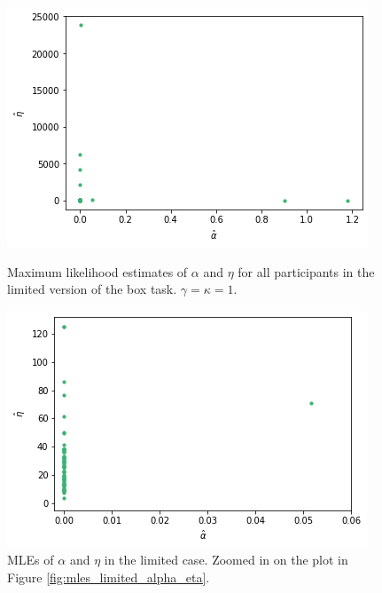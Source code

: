 \begin{figure}
    \centering
    \begin{minipage}{0.48\textwidth}
        \centering
        \includegraphics[scale=0.38]{pictures/plotted_mles_limited_alpha_eta_gk1.png}
        \caption[MLEs of $\alpha$ and $\eta$, limited. $\gamma=\kappa=1$]{Maximum likelihood estimates of $\alpha$ and $\eta$ for all participants in the limited version of the box task. $\gamma=\kappa=1$.}
        \label{fig:mles_limited_alpha_eta}
    \end{minipage}\hfill
    \begin{minipage}{0.48\textwidth}
        \centering
        \includegraphics[scale=0.38]{pictures/plotted_mles_limited_alpha_eta_gk1_zoomed.png}
        \caption[MLEs of $\alpha$ and $\eta$ zoomed, limited. $\gamma=\kappa=1$]{MLEs of $\alpha$ and $\eta$ in the limited case. Zoomed in on the plot in Figure \ref{fig:mles_limited_alpha_eta}.}
        \label{fig:mles_limited_alpha_eta_zoomed}
    \end{minipage}
\end{figure}

